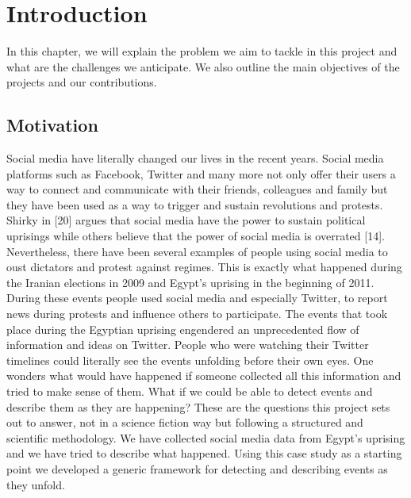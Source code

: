 \textbf{}%
\chapter{Introduction}\label{Introduction}

\ifpdf
    \graphicspath{{Introduction/IntroductionFigs/PNG/}{Introduction/IntroductionFigs/PDF/}{Introduction/IntroductionFigs/}}
\else
    \graphicspath{{Introduction/IntroductionFigs/EPS/}{Introduction/IntroductionFigs/}}
\fi

In this chapter, we will explain the problem we aim to tackle in this project and what are the challenges we anticipate. We also outline 
the main objectives of the projects and our contributions. 

\section{Motivation}
Social media have literally changed our lives in the recent years. Social media platforms such as Facebook, Twitter
and many more not only offer their users a way to connect and communicate with their friends, colleagues and
family but they have been used as a way to trigger and sustain revolutions and protests. Shirky in [20] argues that
social media have the power to sustain political uprisings while others believe that the power of social media is
overrated [14]. Nevertheless, there have been several examples of people using social media to oust dictators and
protest against regimes. This is exactly what happened during the Iranian elections in 2009 and Egypt's uprising in
the beginning of 2011. During these events people used social media and especially Twitter, to report news during
protests and influence others to participate.
The events that took place during the Egyptian uprising engendered an unprecedented flow of information and
ideas on Twitter. People who were watching their Twitter timelines could literally see the events unfolding 
before their own eyes. One wonders what would have happened if someone collected all this information and tried
to make sense of them. What if we could be able to detect events and describe them as they are happening?
These are the questions this project sets out
to answer, not in a science fiction way but following a structured and scientific methodology. We have collected
social media data from Egypt's uprising and we have tried to describe what happened. Using this case study as a 
starting point we developed a generic framework for detecting and describing events as they unfold.\\\\
